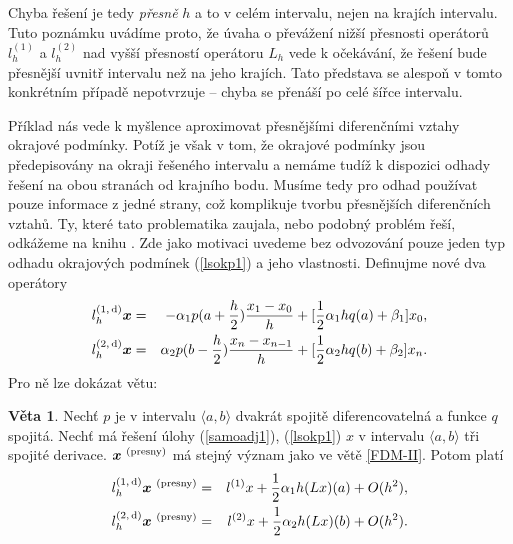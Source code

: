 \documentclass[a4paper, 12pt]{book}
\theoremstyle{definition}
\newtheorem{theorem}{Věta}[section]
\def\d{\,{\rm d}}               %
\def\vc#1{\mathbf{\boldsymbol{#1}}}     %
\begin{document}
Chyba řešení je tedy {\em přesně} $h$ a to v celém intervalu, nejen na 
krajích intervalu. Tuto poznámku uvádíme proto, že úvaha o převážení nižší
přesnosti operátorů $l_h^{(1)}$ a $l_h^{(2)}$ nad vyšší přesností operátoru
$L_h$ vede k očekávání, že řešení bude přesnější uvnitř intervalu než na 
jeho krajích. Tato představa se alespoň v tomto konkrétním případě nepotvrzuje 
-- chyba se přenáší po celé šířce intervalu.

Příklad nás vede k myšlence aproximovat přesnějšími diferenčními vztahy 
okrajové podmínky. Potíž je však v tom, že okrajové podmínky jsou předepisovány 
na okraji řešeného intervalu a nemáme tudíž k dispozici odhady řešení na obou 
stranách od krajního bodu. Musíme tedy pro odhad používat pouze informace 
z jedné strany, což komplikuje tvorbu přesnějších diferenčních vztahů. Ty,
které tato problematika zaujala, nebo podobný problém řeší, odkážeme na 
knihu \cite{Vit}. Zde jako motivaci uvedeme bez odvozování pouze jeden typ 
odhadu okrajových podmínek (\ref{lsokp1}) a jeho vlastnosti. Definujme nové 
dva operátory
\begin{eqnarray}\label{opl1dh}
l_h^{(1,\d)} \vc x&=&-\alpha_1 p(a+\frac h2) \frac{x_1-x_0}h + [\frac 12\alpha_1 hq(a)+\beta_1]x_0,\\ \label{opl2dh}
l_h^{(2,\d)} \vc x&=&\alpha_2 p(b-\frac h2) \frac{x_n-x_{n-1}}h + [\frac 12\alpha_2 hq(b)+\beta_2]x_n.
\end{eqnarray}
Pro ně lze dokázat větu:
\begin{theorem}\label{FDM-B}
Nechť $p$ je v intervalu $\langle a,b\rangle$ dvakrát spojitě diferencovatelná 
a funkce $q$ spojitá. Nechť má řešení úlohy (\ref{samoadj1}), (\ref{lsokp1}) 
$x$ v intervalu $\langle a,b\rangle$ tři spojité derivace. 
$\vc x^{\ \rm(presny)}$ má stejný význam jako ve větě \ref{FDM-II}. Potom platí
\begin{eqnarray*}
l_h^{(1,\d)} \vc x^{\ \rm(presny)} &=& l^{(1)}x+ \frac 12\alpha_1 h(Lx)(a)+O(h^2),\\
l_h^{(2,\d)} \vc x^{\ \rm(presny)} &=& l^{(2)}x+ \frac 12\alpha_2 h(Lx)(b)+O(h^2).
\end{eqnarray*}
\end{theorem}
\end{document}
